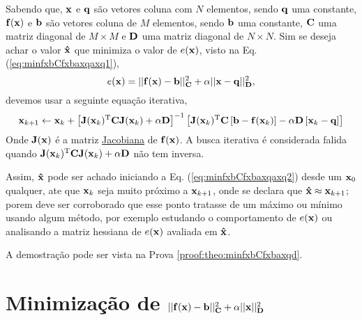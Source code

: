 \begin{theorem}\label{theo:minfxbCfxbaxqaxq}
Sabendo que, $\VECTOR{x}$ e $\VECTOR{q}$ são vetores coluna com $N$ elementos, sendo $\VECTOR{q}$ uma constante, $\VECTOR{f}(\VECTOR{x})$ e 
$\VECTOR{b}$ são vetores coluna de $M$ elementos, sendo $\VECTOR{b}$ uma constante,
$\MATRIX{C}$ uma matriz diagonal de $M \times M$ e 
$\MATRIX{D}$ uma matriz diagonal de $N \times N$.
Sim se deseja achar o valor $\VECTOR{\hat{x}}$ que minimiza o valor de $e(\VECTOR{x})$, visto na Eq. (\ref{eq:minfxbCfxbaxqaxq1}),
\begin{equation}\label{eq:minfxbCfxbaxqaxq1}
e(\VECTOR{x})=||\VECTOR{f}(\VECTOR{x})-\VECTOR{b}||_{\MATRIX{C}}^2+\alpha||\VECTOR{x}-\VECTOR{q}||_{\MATRIX{D}}^2,
\end{equation}
devemos usar a seguinte equação iterativa,
\begin{equation}\label{eq:minfxbCfxbaxqaxq2}
\VECTOR{x}_{k+1}\leftarrow \VECTOR{x}_k+
\left[ \MATRIX{J}(\VECTOR{x}_k)^{\transpose}\MATRIX{C} \MATRIX{J}(\VECTOR{x}_k) +\alpha\MATRIX{D} \right]^{-1}
 \left[\MATRIX{J}(\VECTOR{x}_k)^{\transpose}\MATRIX{C}\left[\VECTOR{b}-\VECTOR{f}(\VECTOR{x}_k)\right]-\alpha\MATRIX{D}\left[\VECTOR{x}_k-\VECTOR{q}\right]\right]
\end{equation}
Onde  $\MATRIX{J}(\VECTOR{x})$ é a matriz \hyperref[def:jacobian]{Jacobiana} \cite{Jacobian} de $\VECTOR{f}(\VECTOR{x})$.
A busca iterativa é considerada falida quando 
$\MATRIX{J}(\VECTOR{x}_k)^{\transpose}\MATRIX{C} \MATRIX{J}(\VECTOR{x}_k) +\alpha\MATRIX{D}$
não tem inversa.


Assim, $\VECTOR{\hat{x}}$ pode ser achado iniciando a Eq. (\ref{eq:minfxbCfxbaxqaxq2}) desde um $\VECTOR{x}_{0}$ qualquer, ate que $\VECTOR{x}_{k}$ seja muito próximo a $\VECTOR{x}_{k+1}$,
onde se declara que $\VECTOR{\hat{x}} \approx \VECTOR{x}_{k+1}$; porem deve ser corroborado
que esse ponto tratasse de um máximo ou mínimo usando algum método, por exemplo estudando o comportamento 
de $e(\VECTOR{x})$ ou analisando a matriz hessiana de $e(\VECTOR{x})$ avaliada em $\VECTOR{\hat{x}}$.

A demostração pode ser vista na Prova \ref{proof:theo:minfxbCfxbaxqd}.
\end{theorem} 



\section{Minimização de $||\VECTOR{f}(\VECTOR{x})-\VECTOR{b}||_{\MATRIX{C}}^2+\alpha||\VECTOR{x}||_{\MATRIX{D}}^2$  
}

